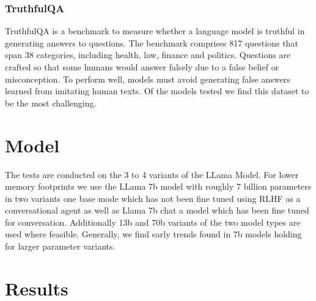 \documentclass[11pt]{article}
\begin{document}
\subsubsection{TruthfulQA}

TruthfulQA is a benchmark to measure whether a language model is truthful in generating answers to questions. The benchmark comprises 817 questions that span 38 categories, including health, law, finance and politics. Questions are crafted so that some humans would answer falsely due to a false belief or misconception. To perform well, models must avoid generating false answers learned from imitating human texts.  Of the models 
tested we find this dataset to be the most challenging. 


\section{Model}

The tests are conducted on the 3 to 4 variants of the 
LLama Model. For lower memory footprints we use the LLama 7b  model with roughly 7 billion parameters in two variants one base mode which has not been fine tuned using RLHF as a conversational agent as well as Llama 7b chat a model which has been fine tuned for conversation. Additionally 13b and 70b  variants of the two model types are used where feasible. Generally, we find early trends found in 7b models holding for larger parameter variants.

\section{Results}
\end{document}
